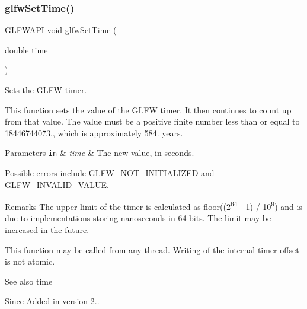 \subsubsection{\texorpdfstring{glfw\+Set\+Time()}{glfwSetTime()}}
{\footnotesize\ttfamily G\+L\+F\+W\+A\+PI void glfw\+Set\+Time (\begin{DoxyParamCaption}\item[{double}]{time }\end{DoxyParamCaption})}



Sets the G\+L\+FW timer. 

This function sets the value of the G\+L\+FW timer. It then continues to count up from that value. The value must be a positive finite number less than or equal to 18446744073., which is approximately 584. years.


\begin{DoxyParams}[1]{Parameters}
\mbox{\tt in}  & {\em time} & The new value, in seconds.\\
\hline
\end{DoxyParams}
Possible errors include \hyperlink{group__errors_ga2374ee02c177f12e1fa76ff3ed15e14a}{G\+L\+F\+W\+\_\+\+N\+O\+T\+\_\+\+I\+N\+I\+T\+I\+A\+L\+I\+Z\+ED} and \hyperlink{group__errors_gaaf2ef9aa8202c2b82ac2d921e554c687}{G\+L\+F\+W\+\_\+\+I\+N\+V\+A\+L\+I\+D\+\_\+\+V\+A\+L\+UE}.

\begin{DoxyRemark}{Remarks}
The upper limit of the timer is calculated as floor((2\textsuperscript{64} -\/ 1) / 10\textsuperscript{9}) and is due to implementations storing nanoseconds in 64 bits. The limit may be increased in the future.
\end{DoxyRemark}
This function may be called from any thread. Writing of the internal timer offset is not atomic.

\begin{DoxySeeAlso}{See also}
time
\end{DoxySeeAlso}
\begin{DoxySince}{Since}
Added in version 2.. 
\end{DoxySince}
